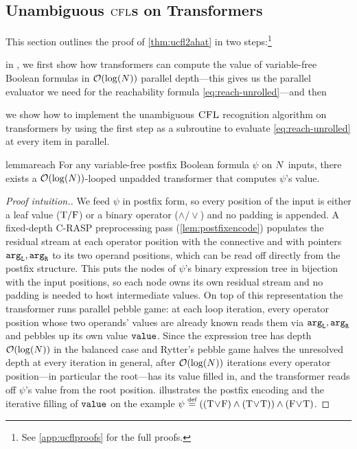 \documentclass{article}
\begin{document}
\subsection{Unambiguous ${\textsc{CFL}}$s on Transformers}\label{subsec:unambiguousahat}
This section outlines the proof of \cref{thm:ucfl2ahat} in two steps:\footnote{See \cref{app:ucflproofs} for the full proofs.}
\begin{enumerate*}[label=\textit{(\arabic*)}]
    \item in , we first show how transformers can compute the value of variable-free Boolean formulas in ${{ \mathcal{O}}}(\log({{ N}}))$ parallel depth---this gives us the parallel evaluator we need for the reachability formula \cref{eq:reach-unrolled}---and then
    \item we show how to implement the unambiguous ${\textsc{CFL}}$ recognition algorithm on transformers by using the first step as a subroutine to evaluate \cref{eq:reach-unrolled} at every item in parallel.
\end{enumerate*}


\begin{restatable}{lemma}{reach}\label{lem:reach}
    For any variable-free postfix Boolean formula $\psi$ on ${{ N}}$ inputs, there exists a ${{ \mathcal{O}}}(\log({{ N}}))$-looped unpadded transformer that computes $\psi$'s value.
\end{restatable}
\begin{proof}[Proof intuition.]
    We feed $\psi$ in postfix form, so every position of the input is either a leaf value (${\mathbin{\mathrm{T}}}/{\mathbin{\mathrm{F}}}$) or a binary operator ($\land/\lor$) and no padding is appended.
    A fixed-depth \textsc{C-RASP} preprocessing pass (\cref{lem:postfixencode}) populates the residual stream at each operator position with the connective and with pointers ${\mathtt{arg}_\mathtt{L}},{\mathtt{arg}_\mathtt{R}}$ to its two operand positions, which can be read off directly from the postfix structure.
    This puts the nodes of $\psi$'s binary expression tree in bijection with the input positions, so each node owns its own residual stream and no padding is needed to host intermediate values.
    On top of this representation the transformer runs  parallel pebble game: at each loop iteration, every operator position whose two operands' values are already known reads them via ${\mathtt{arg}_\mathtt{L}},{\mathtt{arg}_\mathtt{R}}$ and pebbles up its own value ${\mathtt{value}}$.
    Since the expression tree has depth ${{ \mathcal{O}}}(\log({{ N}}))$ in the balanced case and Rytter's pebble game halves the unresolved depth at every iteration in general, after ${{ \mathcal{O}}}(\log({{ N}}))$ iterations every operator position---in particular the root---has its value filled in, and the transformer reads off $\psi$'s value from the root position.
     illustrates the postfix encoding and the iterative filling of ${\mathtt{value}}$ on the example $\psi \defeq ((\TRUE\!\lor\!\FALSE)\land(\TRUE\!\lor\!\TRUE))\land(\FALSE\!\lor\!\TRUE)$.
\end{proof}
\end{document}
